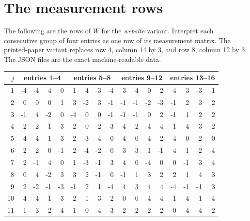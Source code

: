 \documentclass[11pt]{article}
\theoremstyle{definition}
\begin{document}
\section{The measurement rows}\label{app:rows}
The following are the rows of $W$ for the \emph{website} variant. Interpret each consecutive group of four entries as one row of its measurement matrix. The printed-paper variant replaces row 4, column 14 by $3$, and row 8, column 12 by $3$. The JSON files are the exact machine-readable data.
\begin{center}
\setlength{\tabcolsep}{4pt}
\footnotesize
\begin{tabular}{r|rrrr|rrrr|rrrr|rrrr}
$j$&\multicolumn{4}{c|}{entries 1--4}&\multicolumn{4}{c|}{entries 5--8}&\multicolumn{4}{c|}{entries 9--12}&\multicolumn{4}{c}{entries 13--16}\\
\hline
1&-4&-4&4&0&1&4&-3&-4&3&4&0&2&4&3&-3&1\\
2&0&0&0&1&3&-2&3&-1&-1&-1&-2&-3&-1&2&3&2\\
3&-1&4&-2&0&-4&0&0&-1&-1&-1&0&2&-1&1&2&2\\
4&-2&-2&1&-3&-2&0&-2&3&4&2&-4&4&1&4&3&-2\\
5&4&-4&1&3&2&-3&-4&0&-4&0&4&2&-4&0&-2&0\\
6&2&2&0&-1&2&-4&-2&0&3&3&1&-1&4&1&-2&-4\\
7&2&-1&4&0&1&-3&-1&3&4&0&-4&0&0&-1&3&4\\
8&0&4&-2&3&3&2&-1&0&-1&1&3&2&2&1&4&3\\
9&2&-2&-1&-3&-1&2&1&-4&4&3&4&4&-4&-1&-1&3\\
10&-4&4&-1&-3&2&1&-3&2&0&0&4&4&-1&4&1&-4\\
11&1&3&2&4&1&0&-4&3&-2&-2&-2&2&0&-4&4&-2\\
\end{tabular}
\end{center}
\end{document}
